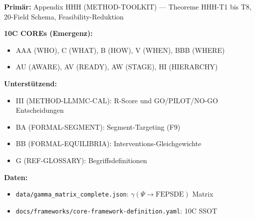 \begin{tcolorbox}[colback=gray!5!white, colframe=gray!75!black,
    title=Appendix-Referenzen]

\textbf{Primär:} Appendix HHH (METHOD-TOOLKIT) --- Theoreme HHH-T1 bis T8, 20-Field Schema, Feasibility-Reduktion

\textbf{10C COREs (Emergenz):}
\begin{itemize}[nosep]
\item AAA (WHO), C (WHAT), B (HOW), V (WHEN), BBB (WHERE)
\item AU (AWARE), AV (READY), AW (STAGE), HI (HIERARCHY)
\end{itemize}

\textbf{Unterstützend:}
\begin{itemize}[nosep]
\item III (METHOD-LLMMC-CAL): R-Score und GO/PILOT/NO-GO Entscheidungen
\item BA (FORMAL-SEGMENT): Segment-Targeting (F9)
\item BB (FORMAL-EQUILIBRIA): Interventions-Gleichgewichte
\item G (REF-GLOSSARY): Begriffsdefinitionen
\end{itemize}

\textbf{Daten:}
\begin{itemize}[nosep]
\item \texttt{data/gamma\_matrix\_complete.json}: $\gamma(\Psi \rightarrow \text{FEPSDE})$ Matrix
\item \texttt{docs/frameworks/core-framework-definition.yaml}: 10C SSOT
\end{itemize}

\end{tcolorbox}

